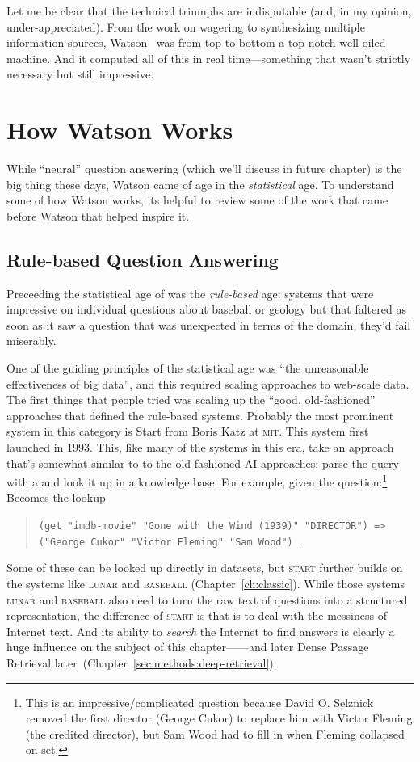 Let me be clear that the technical triumphs are indisputable (and, in
my opinion, under-appreciated).
%
From the work on wagering to synthesizing multiple information sources,
Watson~\citep{ferruci-10} was from top to bottom a top-notch well-oiled
machine.
%
And it computed all of this in real time---something that wasn't
strictly necessary but still impressive.

\section{How Watson Works}

While ``neural'' question answering (which we'll discuss in future
chapter) is the big thing these days, Watson came of age in the
\emph{statistical} age.
%
To understand some of how Watson works, its helpful to review some of
the work that came before Watson that helped inspire it.

\subsection{Rule-based Question Answering}

Preceeding the statistical age of  was the \emph{rule-based}
age: systems that were impressive on individual questions about
baseball or geology but that faltered as soon as it saw a question
that was unexpected in terms of the domain, they'd fail miserably.

One of the guiding principles of the statistical age was ``the
unreasonable effectiveness of big data'', and this required scaling 
approaches to web-scale data.
%
The first things that people tried was scaling up the ``good,
old-fashioned'' approaches that defined the rule-based systems.
%
Probably the most prominent system in this category is Start from Boris Katz
at \textsc{mit}.  This system first launched in 1993.
%
This, like many of the systems in
this era, take an approach that’s somewhat similar to to the old-fashioned AI
approaches: parse the query with a and look it up in a knowledge base.
%
For example, given the question:\footnote{This is an impressive/complicated question
    because David O. Selznick removed the first director (George Cukor) to
    replace him with Victor Fleming (the credited director), but Sam Wood had
    to fill in when Fleming collapsed on set.}
%
%
Becomes the lookup
\begin{quote}
  \texttt{(get "imdb-movie" "Gone with the Wind (1939)" "DIRECTOR") =>
    ("George Cukor" "Victor Fleming" "Sam Wood")}~\citep{katz-02}.
\end{quote}
%
Some of these can be looked up directly in datasets, but \textsc{start}
further builds on the systems like \textsc{lunar} and \textsc{baseball}
(Chapter~\ref{ch:classic}).
%
While those systems \textsc{lunar} and
\textsc{baseball} also need to turn the raw text of questions into a structured
representation, the difference of \textsc{start} is that
is to deal with the
messiness of Internet text.
%
And its ability to \emph{search} the
Internet to find answers is clearly a huge influence on the subject of this
chapter---\watson{}---and later Dense Passage
Retrieval later~(Chapter~\ref{sec:methods:deep-retrieval}).

